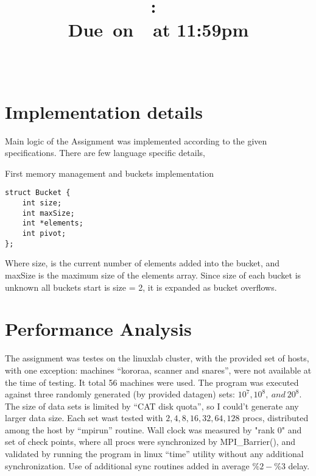 \documentclass{article}
\title{
    \vspace{2in}
    \textmd{\textbf{\hmwkClass:\ \hmwkTitle}}\\
        \normalsize\vspace{0.1in}\small{Due\ on\ \hmwkDueDate\ at 11:59pm}\\
        \vspace{0.1in}\large{\textit{\hmwkClassInstructor\ \hmwkClassTime}}
    \vspace{3in}
}
\author{\textbf{\hmwkAuthorName}}
\date{  }
\begin{document}
\maketitle

\pagebreak

\section{Implementation details}

Main logic of the Assignment was implemented according to the given specifications. 
There are few language specific details, 

First memory management and buckets implementation
\begin{lstlisting}
struct Bucket {
    int size;
    int maxSize;
    int *elements;
    int pivot;
};
\end{lstlisting}

Where size, is the current number of elements added into the bucket, and maxSize is the
maximum size of the elements array.
Since size of each bucket is unknown all buckets start is size = 2, it is expanded as bucket
overflows.


\section{Performance Analysis}

The assignment was testes on the linuxlab cluster, with the provided set of hosts, with one
exception: machines ``kororaa, scanner and snares'', were not available at the time of
testing. It total 56 machines were used. The program was executed against three randomly
generated (by provided datagen) sets: $10^7,
10^8,\ and \  20^8$. The size of data sets is limited by ``CAT disk quota'', so I could't
generate any larger data size. Each set wast tested with $2,4,8,16,32,64,128$ procs,
distributed among the host by ``mpirun'' routine.
Wall clock was measured by "rank 0" and set of check points, where all procs were
synchronized by MPI\_Barrier(), and validated by running the program in linux ``time''
utility without any additional synchronization. Use of additional sync routines added in average $\%2 -
\%3$  delay.
\\
\end{document}
